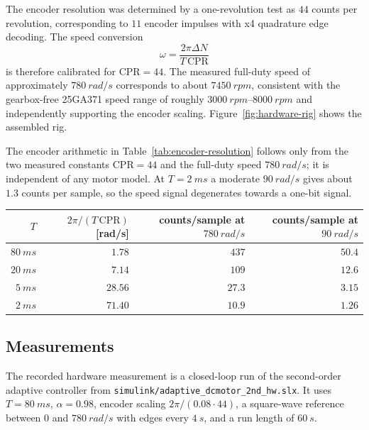 The encoder resolution was determined by a one-revolution test as
\(44\) counts per revolution, corresponding to \(11\) encoder impulses with
x4 quadrature edge decoding. The speed conversion
\[
  \omega = \frac{2\pi \Delta N}{T\,\mathrm{CPR}}
\]
is therefore calibrated for \(\mathrm{CPR}=44\). The measured full-duty speed
of approximately \(\SI{780}{rad/s}\) corresponds to about \(\SI{7450}{rpm}\),
consistent with the gearbox-free 25GA371 speed range of roughly
\(\SIrange{3000}{8000}{rpm}\) and independently supporting the encoder scaling.
Figure~\ref{fig:hardware-rig} shows the assembled rig.

The encoder arithmetic in Table~\ref{tab:encoder-resolution} follows only from
the two measured constants \(\mathrm{CPR}=44\) and the full-duty speed
\(\SI{780}{rad/s}\); it is independent of any motor model. At \(T=\SI{2}{ms}\)
a moderate \(\SI{90}{rad/s}\) gives about \(1.3\) counts per sample, so the
speed signal degenerates towards a one-bit signal.

\begin{scripttable}
  \centering
  \caption{Encoder resolution from the measured CPR and full-duty speed.}
  \label{tab:encoder-resolution}
  \begin{tabular}{rrrr}
    \toprule
    \(T\) & \(2\pi/(T\,\mathrm{CPR})\) [\si{rad/s}] &
    counts/sample at \(\SI{780}{rad/s}\) &
    counts/sample at \(\SI{90}{rad/s}\) \\
    \midrule
    \(\SI{80}{ms}\) & \(1.78\)  & \(437\)  & \(50.4\) \\
    \(\SI{20}{ms}\) & \(7.14\)  & \(109\)  & \(12.6\) \\
    \(\SI{5}{ms}\)  & \(28.56\) & \(27.3\) & \(3.15\) \\
    \(\SI{2}{ms}\)  & \(71.40\) & \(10.9\) & \(1.26\) \\
    \bottomrule
  \end{tabular}
\end{scripttable}

\subsection{Measurements}\label{sec:hardware-measurements}

The recorded hardware measurement is a closed-loop run of the second-order
adaptive controller from \texttt{simulink/adaptive\_dcmotor\_2nd\_hw.slx}. It
uses \(T=\SI{80}{ms}\), \(\alpha=0.98\), encoder scaling
\(2\pi/(0.08\cdot44)\), a square-wave reference between \(0\) and
\(\SI{780}{rad/s}\) with edges every \(\SI{4}{s}\), and a run length of
\(\SI{60}{s}\).

